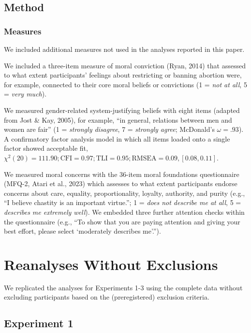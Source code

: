 \documentclass[12pt, letterpaper]{article}
\begin{document}
\hypertarget{method-1}{%
\subsection{Method}\label{method-1}}

\hypertarget{measures}{%
\subsubsection{Measures}\label{measures}}

We included additional measures not used in the analyses reported in
this paper.

We included a three-item measure of moral conviction (Ryan, 2014) that
assessed to what extent participants' feelings about restricting or
banning abortion were, for example, connected to their core moral
beliefs or convictions (1 = \emph{not at all}, 5 = \emph{very much}).

We measured gender-related system-justifying beliefs with eight items
(adapted from Jost \& Kay, 2005), for example, ``in general, relations
between men and women are fair'' (1 = \emph{strongly disagree}, 7 =
\emph{strongly agree}; McDonald's \(\omega = .93\)). A confirmatory
factor analysis model in which all items loaded onto a single factor
showed acceptable fit,
\(\chi^2 (20) = 111.90; \text{CFI} = 0.97; \text{TLI} = 0.95; \text{RMSEA} = 0.09, [0.08, 0.11]\).

We measured moral concerns with the 36-item moral foundations
questionnaire (MFQ-2, Atari et al., 2023) which assesses to what extent
participants endorse concerns about care, equality, proportionality,
loyalty, authority, and purity (e.g., ``I believe chastity is an
important virtue.''; 1 = \emph{does not describe me at all}, 5 =
\emph{describes me extremely well}). We embedded three further attention
checks within the questionnaire (e.g., ``To show that you are paying
attention and giving your best effort, please select `moderately
describes me'.'').

\hypertarget{reanalyses-without-exclusions}{%
\section{Reanalyses Without
Exclusions}\label{reanalyses-without-exclusions}}

We replicated the analyses for Experiments 1-3 using the complete data
without excluding participants based on the (preregistered) exclusion
criteria.

\hypertarget{experiment-1-1}{%
\subsection{Experiment 1}\label{experiment-1-1}}
\end{document}

